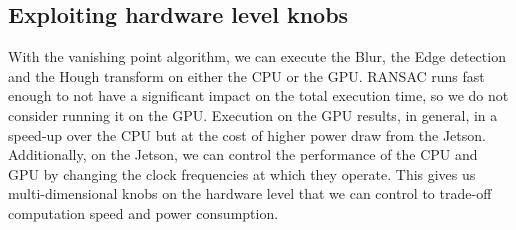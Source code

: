 \subsection{Exploiting hardware level knobs}
With the vanishing point algorithm, we can execute the Blur, the Edge detection and the Hough transform on either the CPU or the GPU. 
RANSAC runs fast enough to not have a significant impact on the total execution time, so we do not consider running it on the GPU.
Execution on the GPU results, in general, in a speed-up over the CPU but at the cost of higher power draw from the Jetson. 
Additionally, on the Jetson, we can control the performance of the CPU and GPU by changing the clock frequencies at which they operate. 
This gives us multi-dimensional knobs on the hardware level that we can control to trade-off computation speed and power consumption.




